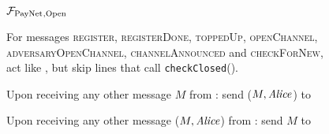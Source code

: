 \begin{figure}[!htbp]
  \begin{systembox}{$\mathcal{F}_{\mathrm{PayNet}}{}_{\mathrm{, Open}}$}
    \begin{algorithmic}[1]
      \State For messages \textsc{register}, \textsc{registerDone},
      \textsc{toppedUp}, \textsc{openChannel}, \textsc{adversaryOpenChannel},
      \textsc{channelAnnounced} and \textsc{checkForNew}, act like \fpaynet{},
      but skip lines that call \texttt{checkClosed}().
      \Statex

      \State Upon receiving any other message $M$ from \alice:
      \Indent
          \State send ($M, \mathit{Alice}$) to \simulator
        \EndIf
      \EndIndent
      \Statex

      \State Upon receiving any other message ($M, \mathit{Alice}$) from \simulator:
      \Indent
          \State send $M$ to \alice
        \EndIf
      \EndIndent
    \end{algorithmic}
  \end{systembox}
  \caption{}
  \label{alg:proof:fpaynet:open}
\end{figure}

